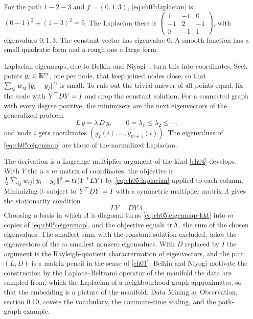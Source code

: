 For the path $1-2-3$ and $f=(0,1,3)$, \eqref{eq:ch05:laplacian} is $(0-1)^2+(1-3)^2=5$. The Laplacian there is $\begin{pmatrix}1&-1&0\\-1&2&-1\\0&-1&1\end{pmatrix}$, with eigenvalues $0,1,3$. The constant vector has eigenvalue $0$. A smooth function has a small quadratic form and a rough one a large form.

Laplacian eigenmaps, due to Belkin and Niyogi~\cite{belkin2003}, turn this into coordinates. Seek points $y_i\in\mathbb{R}^m$, one per node, that keep joined nodes close, so that $\sum_{ij}w_{ij}\lVert y_i-y_j\rVert^2$ is small. To rule out the trivial answer of all points equal, fix the scale with $Y^{\top} DY=I$ and drop the constant solution. For a connected graph with every degree positive, the minimizers are the next eigenvectors of the generalized problem
\begin{equation}\label{eq:ch05:eigenmap}
L\,y=\lambda\,D\,y,\qquad 0=\lambda_1\le\lambda_2\le\cdots,
\end{equation}
and node $i$ gets coordinates $(y_2(i),\ldots,y_{m+1}(i))$. The eigenvalues of \eqref{eq:ch05:eigenmap} are those of the normalized Laplacian.

The derivation is a Lagrange-multiplier argument of the kind \cref{ch04} develops. With $Y$ the $n\times m$ matrix of coordinates, the objective is $\tfrac12\sum_{ij}w_{ij}\lVert y_i-y_j\rVert^2=\operatorname{tr}(Y^{\top} LY)$ by \eqref{eq:ch05:laplacian} applied to each column. Minimizing it subject to $Y^{\top} DY=I$ with a symmetric multiplier matrix $\Lambda$ gives the stationarity condition
\begin{equation}\label{eq:ch05:eigenmap-kkt}
LY=DY\Lambda .
\end{equation}
Choosing a basis in which $\Lambda$ is diagonal turns \eqref{eq:ch05:eigenmap-kkt} into $m$ copies of \eqref{eq:ch05:eigenmap}, and the objective equals $\operatorname{tr}\Lambda$, the sum of the chosen eigenvalues. The smallest sum, with the constant solution excluded, takes the eigenvectors of the $m$ smallest nonzero eigenvalues. With $D$ replaced by $I$ the argument is the Rayleigh-quotient characterization of eigenvectors, and the pair $(L,D)$ is a matrix pencil in the sense of \cref{ch01}. Belkin and Niyogi motivate the construction by the Laplace--Beltrami operator of the manifold the data are sampled from, which the Laplacian of a neighbourhood graph approximates, so that the embedding is a picture of the manifold. Data Mining as Observation, section 0.10, covers the vocabulary, the commute-time scaling, and the path-graph example.

